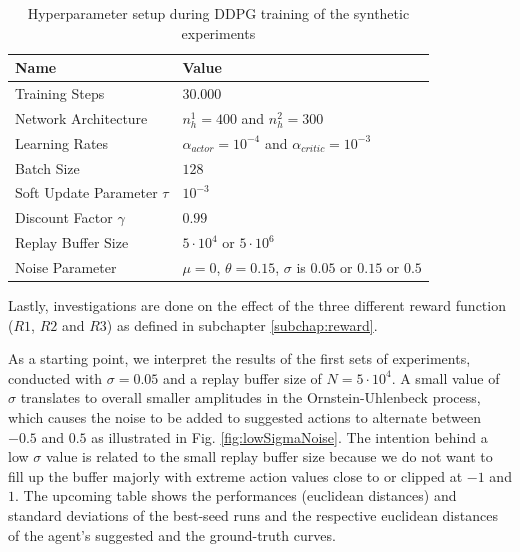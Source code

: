 \begin{table}[H]
\centering
\begin{tabular}{|l|l|}
\hline
\textbf{Name}                & \textbf{Value}                                                \\ \hline
Training Steps               & $30.000$                                                      \\ \hline
Network Architecture         & $n_{h}^{1}=400$ and $n_{h}^{2}=300$       \\ \hline
Learning Rates               & $\alpha_{actor} = 10^{-4}$ and $\alpha_{critic}= 10^{-3}$     \\ \hline
Batch Size                   & $128$                                                         \\ \hline
Soft Update Parameter $\tau$ & $10^{-3}$                                                     \\ \hline
Discount Factor $\gamma$     & $0.99$                                                        \\ \hline
Replay Buffer Size           & $5\cdot 10^4$ or $5 \cdot 10^6$                               \\ \hline
Noise Parameter              & $\mu=0$, $\theta=0.15$, $\sigma$ is $0.05$ or $0.15$ or $0.5$ \\ \hline
\end{tabular}
\caption{\label{tab:hyperDDPG} Hyperparameter setup during DDPG training of the synthetic experiments}
\end{table}
\par
Lastly, investigations are done on the effect of the three different reward function ($R1$, $R2$ and $R3$) as defined in subchapter \ref{subchap:reward}.
\par
As a starting point, we interpret the results of the first sets of experiments, conducted with $\sigma=0.05$ and a replay buffer size of $N=5 \cdot 10^4$. A small value of $\sigma$ translates to overall smaller amplitudes in the Ornstein-Uhlenbeck process, which causes the noise to be added to suggested actions to alternate between $-0.5$ and $0.5$ as illustrated in Fig. \ref{fig:lowSigmaNoise}. The intention behind a low $\sigma$ value is related to the small replay buffer size because we do not want to fill up the buffer majorly with extreme action values close to or clipped at $-1$ and $1$. The upcoming table shows the performances (euclidean distances) and standard deviations of the best-seed runs and the respective euclidean distances of the agent's suggested and the ground-truth curves.

